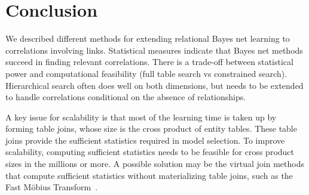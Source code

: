 \documentclass{article}
\begin{document}
%
%



\section{Conclusion} We described different methods for extending relational Bayes net learning to correlations involving links. 
Statistical measures indicate that Bayes net methods succeed in finding relevant correlations. 
There is a trade-off between statistical power and computational feasibility (full table search vs constrained search). 
Hierarchical search often does well on both dimensions, but needs to be extended to handle correlations conditional on the absence of relationships.

A key issue for scalability is that most of the learning time is taken up by forming table joins, whose size is the cross product of entity tables. 
These table joins provide the sufficient statistics required in model selection. 
To improve scalability, computing sufficient statistics needs to be feasible for cross product sizes in the millions or more. 
A possible solution may be the virtual join methods that compute sufficient statistics without materializing table joins, such as the Fast M\"obius Transform~\cite{Schulte2012b,Yin2004}.
\end{document}
